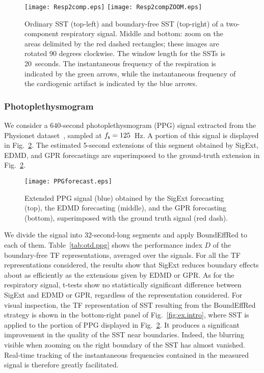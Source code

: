 \begin{figure}
\centering
\texttt{[image: Resp2comp.eps]}
\texttt{[image: Resp2compZOOM.eps]}
\caption{Ordinary SST (top-left) and boundary-free SST (top-right) of a two-component respiratory signal. Middle and bottom: zoom on the areas delimited by the red dashed rectangles; these images are rotated 90 degrees clockwise. The window length for the SSTs is 20~seconds. The instantaneous frequency of the respiration is indicated by the green arrows, while the instantaneous frequency of the cardiogenic artifact is indicated by the blue arrows.}
\label{fig:resp.2.sst}
\end{figure}

\subsubsection{Photoplethysmogram}
\label{ssse:ppg}
We consider a $640$-second photoplethysmogram (PPG) signal extracted from the Physionet dataset~\cite{Pimentel17toward, Goldberger00physiobank}, sampled at $f_{\mathsf s}=125$~Hz. A portion of this signal is displayed in Fig.~\ref{fig:ppg}. The estimated 5-second extensions of this segment obtained by {\sf SigExt}, EDMD, and GPR forecastings  are superimposed to the ground-truth extension in Fig.~\ref{fig:ppg}.

\begin{figure}
\texttt{[image: PPGforecast.eps]}
\caption{Extended PPG signal (blue) obtained by the {\sf SigExt} forecasting (top), the EDMD forecasting (middle), and the GPR forecasting (bottom), superimposed with the ground truth signal (red dash).}
\label{fig:ppg}
\end{figure}

We divide the signal into 32-second-long segments and apply {\sf BoundEffRed} to each of them. Table~\ref{tab:otd.ppg} shows the performance index $D$ of the boundary-free TF representations, averaged over the signals. For all the TF representations considered, the results show that {\sf SigExt} reduces boundary effects about as efficiently as the extensions given by EDMD or GPR. As for the respiratory signal, t-tests show no statistically significant difference between {\sf SigExt} and EDMD or GPR, regardless of the representation considered. For visual inspection, the TF representation of SST resulting from the {\sf BoundEffRed} strategy is shown in the bottom-right panel of Fig.~\ref{fig:ex.intro}, where SST is applied to the portion of PPG displayed in Fig.~\ref{fig:ppg}. It produces a significant improvement in the quality of the SST near boundaries. Indeed, the blurring visible when zooming on the right boundary of the SST has almost vanished. Real-time tracking of the instantaneous frequencies contained in the measured signal is therefore greatly facilitated.

